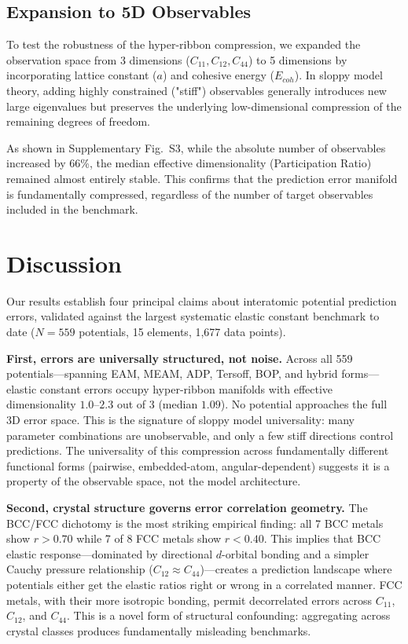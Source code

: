 \documentclass[twocolumn,9pt]{extarticle}
\begin{document}
\subsection{Expansion to 5D Observables}

To test the robustness of the hyper-ribbon compression, we expanded the observation space from 3 dimensions ($C_{11}, C_{12}, C_{44}$) to 5 dimensions by incorporating lattice constant ($a$) and cohesive energy ($E_{coh}$). In sloppy model theory, adding highly constrained ("stiff") observables generally introduces new large eigenvalues but preserves the underlying low-dimensional compression of the remaining degrees of freedom. 

As shown in Supplementary Fig.~S3, while the absolute number of observables increased by 66\%, the median effective dimensionality (Participation Ratio) remained almost entirely stable. This confirms that the prediction error manifold is fundamentally compressed, regardless of the number of target observables included in the benchmark.

\section{Discussion}

Our results establish four principal claims about interatomic potential prediction errors, validated against the largest systematic elastic constant benchmark to date ($N = 559$ potentials, 15 elements, 1,677 data points).

\textbf{First, errors are universally structured, not noise.} Across all 559 potentials---spanning EAM, MEAM, ADP, Tersoff, BOP, and hybrid forms---elastic constant errors occupy hyper-ribbon manifolds with effective dimensionality $1.0$--$2.3$ out of $3$ (median $1.09$). No potential approaches the full 3D error space. This is the signature of sloppy model universality: many parameter combinations are unobservable, and only a few stiff directions control predictions\cite{transtrum2011}. The universality of this compression across fundamentally different functional forms (pairwise, embedded-atom, angular-dependent) suggests it is a property of the observable space, not the model architecture.

\textbf{Second, crystal structure governs error correlation geometry.} The BCC/FCC dichotomy is the most striking empirical finding: all 7 BCC metals show $r > 0.70$ while 7 of 8 FCC metals show $r < 0.40$. This implies that BCC elastic response---dominated by directional $d$-orbital bonding and a simpler Cauchy pressure relationship ($C_{12} \approx C_{44}$)---creates a prediction landscape where potentials either get the elastic ratios right or wrong in a correlated manner. FCC metals, with their more isotropic bonding, permit decorrelated errors across $C_{11}$, $C_{12}$, and $C_{44}$. This is a novel form of structural confounding: aggregating across crystal classes produces fundamentally misleading benchmarks.
\end{document}
